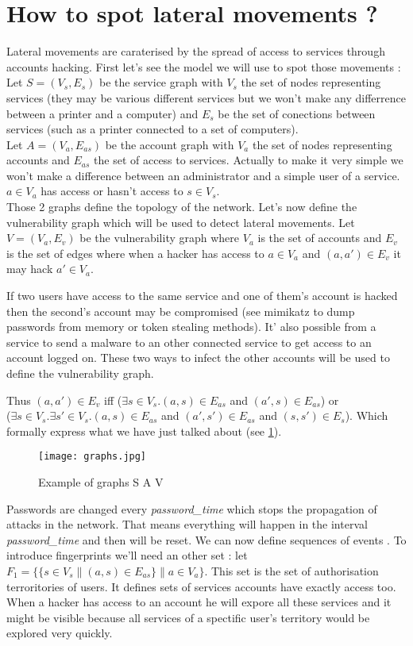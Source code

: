 \documentclass[11pt]{article}
\begin{document}
\section{How to spot lateral movements ?}
\indent Lateral movements are caraterised by the spread of access to services through accounts hacking. First let's see the model we will use to spot those movements :\\
\indent Let $S=(V_s,E_s)$ be the service graph with $V_s$ the set of nodes representing services (they may be various different services but we won't make any differrence between a printer and a computer) and $E_s$ be the set of conections between services (such as a printer connected to a set of computers).\\
\indent Let $A=(V_a,E_{as})$ be the account graph with $V_a$ the set of nodes representing accounts and $E_{as}$ the set of access to services. Actually to make it very simple we won't make a difference between an administrator and a simple user of a service. $a\in V_a$ has access or hasn't access to $s\in V_s$.\\
\indent Those 2 graphs define the topology of the network. Let's now define the vulnerability graph which will be used to detect lateral movements. Let $V=(V_a,E_v)$ be the vulnerability graph where $V_a$ is the set of accounts and $E_v$ is the set of edges where when a hacker has access to $a\in V_a$ and $(a,a')\in E_v$ it may hack $a'\in V_a$. 

If two users have access to the same service and one of them's account is hacked then the second's account may be compromised (see mimikatz to dump passwords from memory or token stealing methods). It' also possible from a service to send a malware to an other connected service to get access to an account logged on. These two ways to infect the other accounts will be used to define the vulnerability graph. 

Thus $(a,a')\in E_v$ iff ($\exists s\in V_s. (a,s)\in E_{as}$ and $(a',s)\in E_{as}$) or\\ ($\exists s\in V_s. \exists s'\in V_s. (a,s)\in E_{as}$ and $(a',s')\in E_{as}$ and $(s,s')\in E_s$). Which formally express what we have just talked about (see \ref{graphs}).

\begin{figure}[!h]
\centering
\texttt{[image: graphs.jpg]}
\caption{Example of graphs S A V}
\label{graphs}
\end{figure}

Passwords are changed every \textit{password\_time} which stops the propagation of attacks in the network. That means everything will happen in the interval \textit{password\_time} and then will be reset. We can now define sequences of events \cite{node}. To introduce fingerprints we'll need an other set : let $F_1 = \{ \{s\in V_s \| (a,s) \in E_{as}\} \| a\in V_a\}$. This set is the set of authorisation terroritories of users. It defines sets of services accounts have exactly access too. When a hacker has access to an account he will expore all these services and it might be visible because all services of a spectific user's territory would be explored very quickly.
\end{document}
